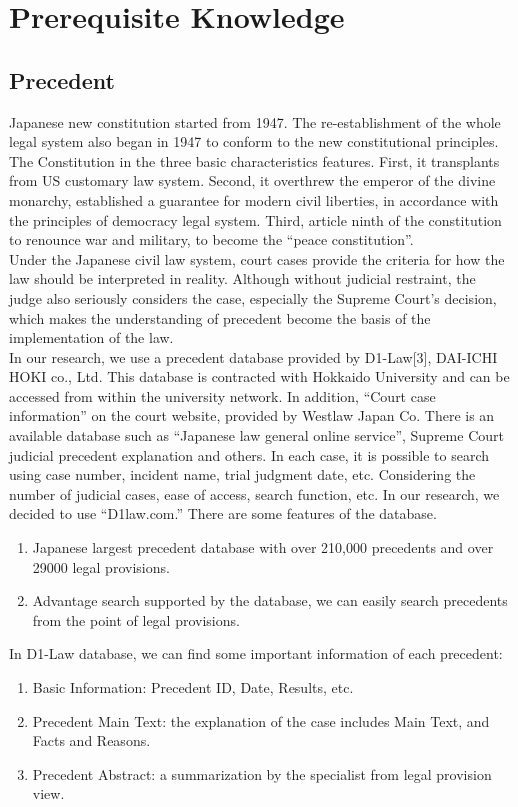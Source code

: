 \chapter{Prerequisite Knowledge}
\section{Precedent}
Japanese new constitution started from 1947. The re-establishment of the whole legal system also began in 1947 to conform to the new constitutional principles. The Constitution in the three basic characteristics features. First, it transplants from US customary law system. Second, it overthrew the emperor of the divine monarchy, established a guarantee for modern civil liberties, in accordance with the principles of democracy legal system. Third, article ninth of the constitution to renounce war and military, to become the ``peace constitution''.\\
Under the Japanese civil law system, court cases provide the criteria for how the law should be interpreted in reality. Although without judicial restraint, the judge also seriously considers the case, especially the Supreme Court's decision, which makes the understanding of precedent become the basis of the implementation of the law.\\
In our research, we use a precedent database provided by D1-Law[3], DAI-ICHI HOKI co., Ltd. This database is contracted with Hokkaido University and can be accessed from within the university network. In addition, ``Court case information'' on the court website, provided by Westlaw Japan Co. There is an available database such as ``Japanese law general online service'', Supreme Court judicial precedent explanation and others. In each case, it is possible to search using case number, incident name, trial judgment date, etc. Considering the number of judicial cases, ease of access, search function, etc. In our research, we decided to use ``D1law.com.'' There are some features of the database.
\begin{enumerate}
\item Japanese largest precedent database with over 210,000 precedents and over 29000 legal provisions.
\item Advantage search supported by the database, we can easily search precedents from the point of legal provisions.
\end{enumerate}
In D1-Law database, we can find some important information of each precedent: 
\begin{enumerate}
\item Basic Information: Precedent ID, Date, Results, etc. 
\item Precedent Main Text: the explanation of the case includes Main Text, and Facts and Reasons.
\item Precedent Abstract: a summarization by the specialist from legal provision view. 
\end{enumerate}
